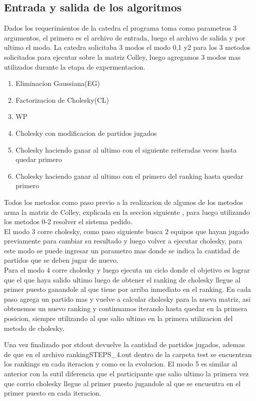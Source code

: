 \subsection{Entrada y salida de los algoritmos}

Dados los requerimientos de la catedra el programa toma como parametros 3 argumentos, el primero es el archivo de entrada, luego el archivo de salida y
por ultimo el modo.  La catedra solicitaba 3 modos el modo 0,1 y2 para los 3 metodos solicitados para ejecutar sobre la matriz Colley, luego agregamos 3 modos mas utilizados durante la etapa 
de expermentacion.
\\
\begin{enumerate}
    \item Eliminacion Gaussiana(EG)
    \item Factorizacion de Cholesky(CL)
    \item WP
    \item Cholesky con modificacion de partidos jugados
    \item Cholesky haciendo ganar al ultimo con el siguiente reiteradas veces hasta quedar primero
    \item Cholesky haciendo ganar al ultimo con el primero del ranking hasta quedar primero
\end{enumerate}
Todos los metodos como paso previo a la realizacion de algunos de los metodos arma la matriz de Colley, explicada en la seccion siguiente , para luego utilizando los metodos 0-2 resolver el sistema pedido.
\\
El modo 3 corre cholesky, como paso siguiente busca 2 equipos que hayan jugado previamente para cambiar su resultado y luego volver a ejecutar cholesky,
para este modo se puede ingresar un parametro mas donde se indica la cantidad de partidos que se deben jugar de nuevo.
\\
Para el modo 4 corre cholesky y luego ejecuta un ciclo donde el objetivo es lograr que el que haya salido ultimo luego de obtener el ranking de cholesky llegue al primer puesto ganandole
al que tiene por arriba inmediato en el ranking. En cada paso agrega un partido mas y vuelve a calcular cholesky para la nueva matriz, asi obtenemos un nuevo ranking y continuamos iterando hasta quedar en la primera posicion,
siempre utilizando al que salio ultimo en la primera utilizacion del metodo de cholesky.

Una vez finalizado por stdout devuelve la cantidad de partidos jugados, ademas de que en el archivo  rankingSTEPS\_4.out dentro de la carpeta test se encuentran los rankings en cada iteracion y como es la evolucion.
El modo 5 es similar al anterior con la sutil diferencia que el participante que salio ultimo la primera vez que corrio cholesky llegue al primer puesto jugandole al que se encuentra en el primer puesto en cada iteracion.

